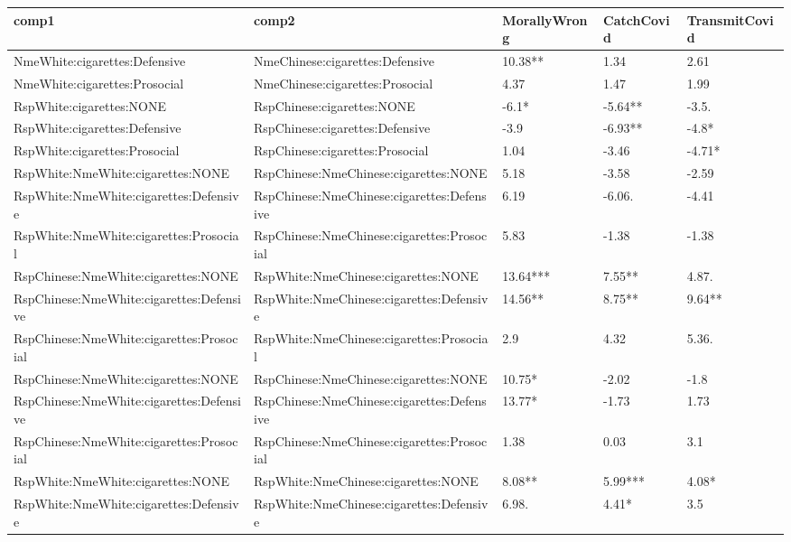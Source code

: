 \documentclass[]{report}
\begin{document}
\begin{table}[ht]
	\centering
	\begin{tabular}{lllll}
		\hline
		comp1 & comp2 & MorallyWrong & CatchCovid & TransmitCovid \\ 
		\hline
		NmeWhite:cigarettes:Defensive  &  NmeChinese:cigarettes:Defensive & 10.38** & 1.34 & 2.61 \\ 
		NmeWhite:cigarettes:Prosocial  &  NmeChinese:cigarettes:Prosocial & 4.37 & 1.47 & 1.99 \\ 
		RspWhite:cigarettes:NONE  &  RspChinese:cigarettes:NONE & -6.1* & -5.64** & -3.5. \\ 
		RspWhite:cigarettes:Defensive  &  RspChinese:cigarettes:Defensive & -3.9 & -6.93** & -4.8* \\ 
		RspWhite:cigarettes:Prosocial  &  RspChinese:cigarettes:Prosocial & 1.04 & -3.46 & -4.71* \\ 
		RspWhite:NmeWhite:cigarettes:NONE  &  RspChinese:NmeChinese:cigarettes:NONE & 5.18 & -3.58 & -2.59 \\ 
		RspWhite:NmeWhite:cigarettes:Defensive  &  RspChinese:NmeChinese:cigarettes:Defensive & 6.19 & -6.06. & -4.41 \\ 
		RspWhite:NmeWhite:cigarettes:Prosocial  &  RspChinese:NmeChinese:cigarettes:Prosocial & 5.83 & -1.38 & -1.38 \\ 
		RspChinese:NmeWhite:cigarettes:NONE  &  RspWhite:NmeChinese:cigarettes:NONE & 13.64*** & 7.55** & 4.87. \\ 
		RspChinese:NmeWhite:cigarettes:Defensive  &  RspWhite:NmeChinese:cigarettes:Defensive & 14.56** & 8.75** & 9.64** \\ 
		RspChinese:NmeWhite:cigarettes:Prosocial  &  RspWhite:NmeChinese:cigarettes:Prosocial & 2.9 & 4.32 & 5.36. \\ 
		RspChinese:NmeWhite:cigarettes:NONE  &  RspChinese:NmeChinese:cigarettes:NONE & 10.75* & -2.02 & -1.8 \\ 
		RspChinese:NmeWhite:cigarettes:Defensive  &  RspChinese:NmeChinese:cigarettes:Defensive & 13.77* & -1.73 & 1.73 \\ 
		RspChinese:NmeWhite:cigarettes:Prosocial  &  RspChinese:NmeChinese:cigarettes:Prosocial & 1.38 & 0.03 & 3.1 \\ 
		RspWhite:NmeWhite:cigarettes:NONE  &  RspWhite:NmeChinese:cigarettes:NONE & 8.08** & 5.99*** & 4.08* \\ 
		RspWhite:NmeWhite:cigarettes:Defensive  &  RspWhite:NmeChinese:cigarettes:Defensive & 6.98. & 4.41* & 3.5 \\ 

\end{tabular}
\end{table}
\end{document}
